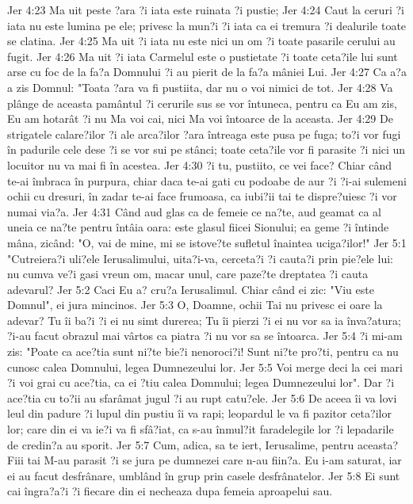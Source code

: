 Jer 4:23  Ma uit peste ?ara ?i iata este ruinata ?i pustie;
Jer 4:24  Caut la ceruri ?i iata nu este lumina pe ele; privesc la mun?i ?i iata ca ei tremura ?i dealurile toate se clatina.
Jer 4:25  Ma uit ?i iata nu este nici un om ?i toate pasarile cerului au fugit.
Jer 4:26  Ma uit ?i iata Carmelul este o pustietate ?i toate ceta?ile lui sunt arse cu foc de la fa?a Domnului ?i au pierit de la fa?a mâniei Lui.
Jer 4:27  Ca a?a a zis Domnul: "Toata ?ara va fi pustiita, dar nu o voi nimici de tot.
Jer 4:28  Va plânge de aceasta pamântul ?i cerurile sus se vor întuneca, pentru ca Eu am zis, Eu am hotarât ?i nu Ma voi cai, nici Ma voi întoarce de la aceasta.
Jer 4:29  De strigatele calare?ilor ?i ale arca?ilor ?ara întreaga este pusa pe fuga; to?i vor fugi în padurile cele dese ?i se vor sui pe stânci; toate ceta?ile vor fi parasite ?i nici un locuitor nu va mai fi în acestea.
Jer 4:30  ?i tu, pustiito, ce vei face? Chiar când te-ai îmbraca în purpura, chiar daca te-ai gati cu podoabe de aur ?i ?i-ai sulemeni ochii cu dresuri, în zadar te-ai face frumoasa, ca iubi?ii tai te dispre?uiesc ?i vor numai via?a.
Jer 4:31  Când aud glas ca de femeie ce na?te, aud geamat ca al uneia ce na?te pentru întâia oara: este glasul fiicei Sionului; ea geme ?i întinde mâna, zicând: "O, vai de mine, mi se istove?te sufletul înaintea uciga?ilor!"
Jer 5:1  "Cutreiera?i uli?ele Ierusalimului, uita?i-va, cerceta?i ?i cauta?i prin pie?ele lui: nu cumva ve?i gasi vreun om, macar unul, care paze?te dreptatea ?i cauta adevarul?
Jer 5:2  Caci Eu a? cru?a Ierusalimul. Chiar când ei zic: "Viu este Domnul", ei jura mincinos.
Jer 5:3  O, Doamne, ochii Tai nu privesc ei oare la adevar? Tu îi ba?i ?i ei nu simt durerea; Tu îi pierzi ?i ei nu vor sa ia înva?atura; ?i-au facut obrazul mai vârtos ca piatra ?i nu vor sa se întoarca.
Jer 5:4  ?i mi-am zis: "Poate ca ace?tia sunt ni?te bie?i nenoroci?i! Sunt ni?te pro?ti, pentru ca nu cunosc calea Domnului, legea Dumnezeului lor.
Jer 5:5  Voi merge deci la cei mari ?i voi grai cu ace?tia, ca ei ?tiu calea Domnului; legea Dumnezeului lor". Dar ?i ace?tia cu to?ii au sfarâmat jugul ?i au rupt catu?ele.
Jer 5:6  De aceea îi va lovi leul din padure ?i lupul din pustiu îi va rapi; leopardul le va fi pazitor ceta?ilor lor; care din ei va ie?i va fi sfâ?iat, ca s-au înmul?it faradelegile lor ?i lepadarile de credin?a au sporit.
Jer 5:7  Cum, adica, sa te iert, Ierusalime, pentru aceasta? Fiii tai M-au parasit ?i se jura pe dumnezei care n-au fiin?a. Eu i-am saturat, iar ei au facut desfrânare, umblând în grup prin casele desfrânatelor.
Jer 5:8  Ei sunt cai îngra?a?i ?i fiecare din ei necheaza dupa femeia aproapelui sau.
